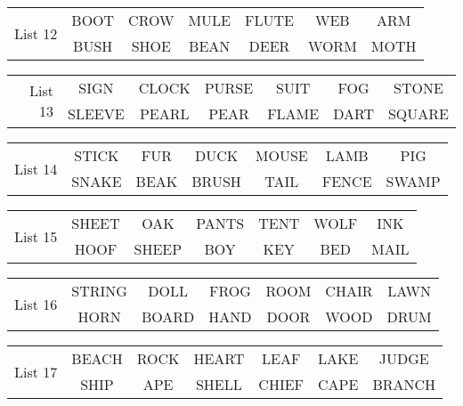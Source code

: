 \documentclass{article}
\begin{document}
\vspace{.1in}
\hspace{.5in}\begin{tabular}{r||c c c c c c }
\multirow{2}{*}{List 12} & BOOT & CROW & MULE & FLUTE & WEB & ARM\\
\cline{2-7}			& BUSH & SHOE & BEAN & DEER & WORM & MOTH\\
\end{tabular}

\vspace{.1in}
\hspace{.5in}\begin{tabular}{r||c c c c c c }
\multirow{2}{*}{List 13} & SIGN & CLOCK & PURSE & SUIT & FOG & STONE\\
\cline{2-7}			& SLEEVE & PEARL & PEAR & FLAME & DART & SQUARE\\
\end{tabular}

\vspace{.1in}
\hspace{.5in}\begin{tabular}{r||c c c c c c }
\multirow{2}{*}{List 14} & STICK & FUR & DUCK & MOUSE & LAMB & PIG\\
\cline{2-7}			& SNAKE & BEAK & BRUSH & TAIL & FENCE & SWAMP\\
\end{tabular}

\vspace{.1in}
\hspace{.5in}\begin{tabular}{r||c c c c c c }
\multirow{2}{*}{List 15} & SHEET & OAK & PANTS & TENT & WOLF & INK\\
\cline{2-7}			& HOOF & SHEEP & BOY & KEY & BED & MAIL\\
\end{tabular}

\vspace{.1in}
\hspace{.5in}\begin{tabular}{r||c c c c c c }
\multirow{2}{*}{List 16} & STRING & DOLL & FROG & ROOM & CHAIR & LAWN\\
\cline{2-7}			& HORN & BOARD & HAND & DOOR & WOOD & DRUM\\
\end{tabular}

\vspace{.1in}
\hspace{.5in}\begin{tabular}{r||c c c c c c }
\multirow{2}{*}{List 17} & BEACH & ROCK & HEART & LEAF & LAKE & JUDGE\\
\cline{2-7}			& SHIP & APE & SHELL & CHIEF & CAPE & BRANCH\\
\end{tabular}
\end{document}
